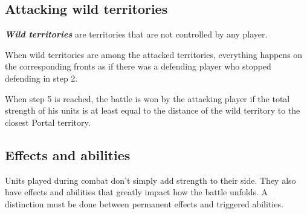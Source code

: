 \documentclass[a4paper]{article}
\begin{document}
  \subsection{Attacking wild territories}
    
    \textbf{\textit{Wild territories}} are territories that are not controlled by any player.
    
    When wild territories are among the attacked territories,
    everything happens on the corresponding fronts as if there was a defending player
    who stopped defending in step 2.
    
    When step 5 is reached, the battle is won by the attacking player if the total
    strength of his units is at least equal to the distance of the wild territory to the closest
    Portal territory.


\subsection{Effects and abilities}

    Units played during combat don't simply add strength to their side.
    They also have effects and abilities that greatly impact how the battle unfolds.
    A distinction must be done between permanent effects and triggered abilities.
\end{document}
